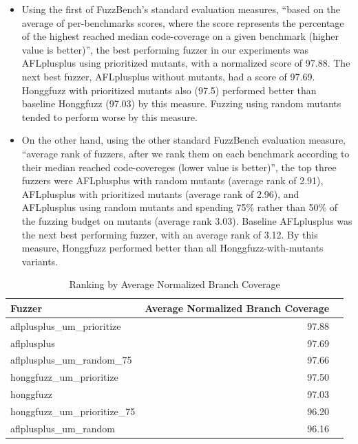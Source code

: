   \begin{itemize}
  \item Using the first of FuzzBench's standard evaluation measures, ``based on the average of per-benchmarks scores, where the score represents the percentage of the highest reached median code-coverage on a given benchmark (higher value is better)'', the best performing fuzzer in our experiments was AFLplusplus using prioritized mutants, with a normalized score of 97.88.  The next best fuzzer, AFLplusplus without mutants, had a score of 97.69.  Honggfuzz with prioritized mutants also (97.5) performed better than baseline Honggfuzz (97.03) by this measure.  Fuzzing using random mutants tended to perform worse by this measure.
    \item On the other hand, using the other standard FuzzBench evaluation measure, ``average rank of fuzzers, after we rank them on each benchmark according to their median reached code-covereges (lower value is better)'', the top three fuzzers were AFLplusplus with random mutants (average rank of 2.91), AFLplusplus with prioritized mutants (average rank of 2.96), and AFLplusplus using random mutants and spending 75\% rather than 50\% of the fuzzing budget on mutants (average rank 3.03).  Baseline AFLplusplus was the next best performing fuzzer, with an average rank of 3.12.  By this measure, Honggfuzz performed better than all Honggfuzz-with-mutants variants.
    \end{itemize}

    \begin{table}
      \begin{tabular}{l|r|r}
        Fuzzer & Average Normalized Branch Coverage \\
        \hline
        \hline
aflplusplus\_um\_prioritize & 97.88 \\
aflplusplus &	97.69 \\
aflplusplus\_um\_random\_75 & 97.66 \\
honggfuzz\_um\_prioritize &	97.50 \\
honggfuzz &	97.03 \\
honggfuzz\_um\_prioritize\_75	& 96.20 \\
aflplusplus\_um\_random &	96.16 \\
      \end{tabular}
      \caption{Ranking by Average Normalized Branch Coverage}
      \label{tab:rankings1}
    \end{table}

